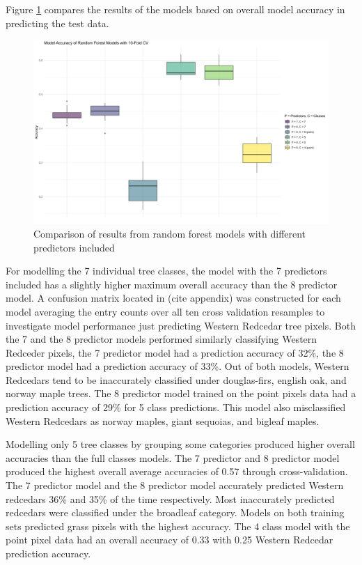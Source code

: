 \documentclass[12pt,twoside]{reedthesis}
\begin{document}
Figure \ref{fig:rfresults} compares the results of the models based on overall model accuracy in predicting the test data.
\begin{figure}

{\centering \includegraphics[width=0.9\linewidth]{figure/rfresults} 

}

\caption{Comparison of results from random forest models with different predictors included}\label{fig:rfresults}
\end{figure}
For modelling the 7 individual tree classes, the model with the 7 predictors included has a slightly higher maximum overall accuracy than the 8 predictor model. A confusion matrix located in (cite appendix) was constructed for each model averaging the entry counts over all ten cross validation resamples to investigate model performance just predicting Western Redcedar tree pixels. Both the 7 and the 8 predictor models performed similarly classifying Western Redceder pixels, the 7 predictor model had a prediction accuracy of 32\%, the 8 predictor model had a prediction accuracy of 33\%. Out of both models, Western Redcedars tend to be inaccurately classified under douglas-firs, english oak, and norway maple trees. The 8 predictor model trained on the point pixels data had a prediction accuracy of 29\% for 5 class predictions. This model also misclassified Western Redcedars as norway maples, giant sequoias, and bigleaf maples.

Modelling only 5 tree classes by grouping some categories produced higher overall accuracies than the full classes models. The 7 predictor and 8 predictor model produced the highest overall average accuracies of 0.57 through cross-validation. The 7 predictor model and the 8 predictor model accurately predicted Western redcedars 36\% and 35\% of the time respectively. Most inaccurately predicted redcedars were classified under the broadleaf category. Models on both training sets predicted grass pixels with the highest accuracy. The 4 class model with the point pixel data had an overall accuracy of 0.33 with 0.25 Western Redcedar prediction accuracy.
\end{document}
